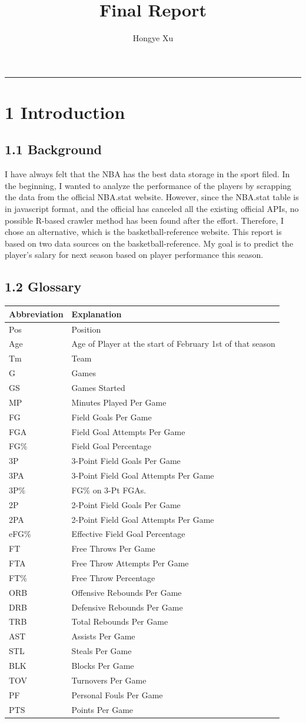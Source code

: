 \documentclass[]{article}
\title{Final Report}
\author{Hongye Xu}
\date{}
\begin{document}
\maketitle

\begin{center}\rule{0.5\linewidth}{\linethickness}\end{center}

\section{1 Introduction}\label{introduction}

\subsection{1.1 Background}\label{background}

I have always felt that the NBA has the best data storage in the sport
filed. In the beginning, I wanted to analyze the performance of the
players by scrapping the data from the official NBA.stat website.
However, since the NBA.stat table is in javascript format, and the
official has canceled all the existing official APIs, no possible
R-based crawler method has been found after the effort. Therefore, I
chose an alternative, which is the basketball-reference website. This
report is based on two data sources on the basketball-reference. My goal
is to predict the player's salary for next season based on player
performance this season.

\subsection{1.2 Glossary}\label{glossary}

\begin{longtable}[]{@{}ll@{}}
\toprule
Abbreviation & Explanation\tabularnewline
\midrule
\endhead
Pos & Position\tabularnewline
Age & Age of Player at the start of February 1st of that
season\tabularnewline
Tm & Team\tabularnewline
G & Games\tabularnewline
GS & Games Started\tabularnewline
MP & Minutes Played Per Game\tabularnewline
FG & Field Goals Per Game\tabularnewline
FGA & Field Goal Attempts Per Game\tabularnewline
FG\% & Field Goal Percentage\tabularnewline
3P & 3-Point Field Goals Per Game\tabularnewline
3PA & 3-Point Field Goal Attempts Per Game\tabularnewline
3P\% & FG\% on 3-Pt FGAs.\tabularnewline
2P & 2-Point Field Goals Per Game\tabularnewline
2PA & 2-Point Field Goal Attempts Per Game\tabularnewline
eFG\% & Effective Field Goal Percentage\tabularnewline
FT & Free Throws Per Game\tabularnewline
FTA & Free Throw Attempts Per Game\tabularnewline
FT\% & Free Throw Percentage\tabularnewline
ORB & Offensive Rebounds Per Game\tabularnewline
DRB & Defensive Rebounds Per Game\tabularnewline
TRB & Total Rebounds Per Game\tabularnewline
AST & Assists Per Game\tabularnewline
STL & Steals Per Game\tabularnewline
BLK & Blocks Per Game\tabularnewline
TOV & Turnovers Per Game\tabularnewline
PF & Personal Fouls Per Game\tabularnewline
PTS & Points Per Game\tabularnewline
\bottomrule
\end{longtable}
\end{document}
